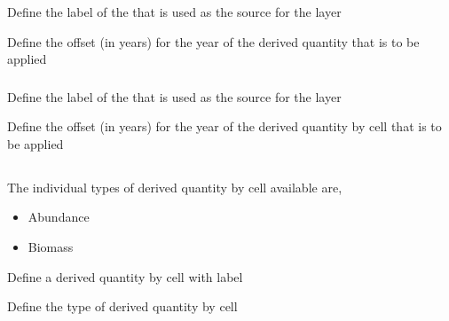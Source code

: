 \subsubsection[Derived quantity layer]{}

 {Define the label of the  that is used as the source for the layer}

 {Define the offset (in years) for the year of the derived quantity that is to be applied}

\subsubsection[Derived quantity by cell layer]{}

 {Define the label of the  that is used as the source for the layer}

 {Define the offset (in years) for the year of the derived quantity by cell that is to be applied}

\subsection{}

The individual types of derived quantity by cell available are,

\begin{itemize}
	\item Abundance
	\item Biomass
\end{itemize}

 {Define a derived quantity by cell with label}

 {Define the type of derived quantity by cell}

